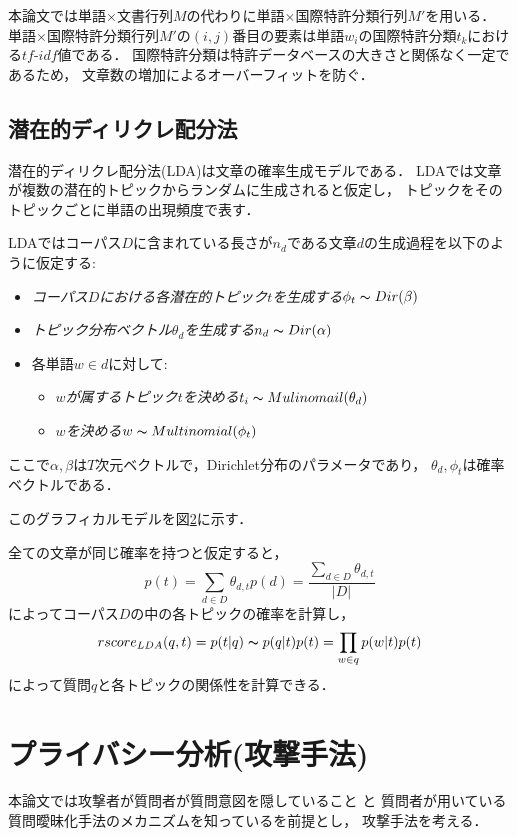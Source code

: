 \documentclass[master]{suribt}
\theoremstyle{definition}
\begin{document}
 本論文では単語$\times$文書行列$M$の代わりに単語$\times$国際特許分類行列$M'$を用いる．
 単語$\times$国際特許分類行列$M'$の$(i,j)$番目の要素は単語$w_i$の国際特許分類$t_k$における$tf\text{-}idf$値である．
 国際特許分類は特許データベースの大きさと関係なく一定であるため，
 文章数の増加によるオーバーフィットを防ぐ．

 \section{潜在的ディリクレ配分法}
 潜在的ディリクレ配分法(LDA)は文章の確率生成モデルである．
 LDAでは文章が複数の潜在的トピックからランダムに生成されると仮定し，
 トピックをそのトピックごとに単語の出現頻度で表す．

 
 LDAではコーパス$D$に含まれている長さが$n_d$である文章$d$の生成過程を以下のように仮定する:
 \begin{itemize}
 \item {\em コーパス$D$における各潜在的トピック$t$を生成する}$\phi_{t} \thicksim Dir(\beta)$
 \item {\em トピック分布ベクトル$\theta_d$を生成する}$n_d \thicksim Dir(\alpha)$
 \item 各単語$w \in d$に対して:
  \begin{itemize}
   \item {\em $w$が属するトピック$t$を決める}$t_i \thicksim Mulinomail(\theta_d)$
   \item {\em $w$を決める}$w \thicksim Multinomial(\phi_{t})$
  \end{itemize}
 \end{itemize}
 
 ここで$\alpha,\beta$は$T$次元ベクトルで，Dirichlet分布のパラメータであり，
 $\theta_d,\phi_{t}$は確率ベクトルである．

 このグラフィカルモデルを図\ref{}に示す．

 全ての文章が同じ確率を持つと仮定すると，
 \begin{equation}
 p(t) = \sum_{d \in D}\theta_{d,t}p(d) = \frac{\sum_{d \in D} \theta_{d,t}}{|D|}
 \end{equation}
 によってコーパス$D$の中の各トピックの確率を計算し，
 \begin{equation}
 rscore_{LDA}(q,t) = p(t|q) \thicksim p(q|t)p(t) = \prod_{w \in q}p(w|t)p(t)
 \end{equation}
 によって質問$q$と各トピックの関係性を計算できる．


 \chapter{プライバシー分析(攻撃手法)}
 本論文では攻撃者が質問者が質問意図を隠していること
 と
 質問者が用いている質問曖昧化手法のメカニズムを知っているを前提とし，
 攻撃手法を考える．
\end{document}
